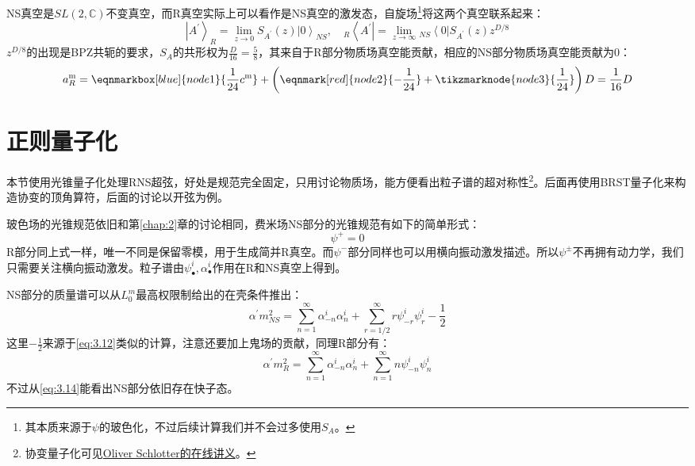 NS真空是$SL(2,\mathbb{C})$不变真空，而R真空实际上可以看作是NS真空的激发态，自旋场\footnote{其本质来源于$\psi$的玻色化\cite{Blumenhagen:2013fgp,Schlotterer:2012zz}，不过后续计算我们并不会过多使用$S_A$。}将这两个真空联系起来：
\begin{equation}
	\left|A^{\prime}\right\rangle_{R}=\lim_{z\to 0}S_{{A^{\prime}}}(z)\left|0\right\rangle_{NS},\quad 
	{}_R\left\langle A^{\prime}\right|=\lim_{z\to\infty}{}_{NS}\left\langle0\right|S_{{A^{\prime}}}(z)z^{D/8}
\end{equation}
$z^{D/8}$的出现是BPZ共轭的要求\cite{itocft}，$S_A$的共形权为$\frac{D}{16}=\frac58$，其来自于R部分物质场真空能贡献，相应的NS部分物质场真空能贡献为0：
\vspace{4em}%
\begin{equation}
	\label{eq:3.12}
	a^{\mathrm{m}}_R=
	\eqnmarkbox[blue]{node1}{\frac{1}{24}c^{\mathrm{m}}}+
	\left(\eqnmark[red]{node2}{-\frac{1}{24}}+\tikzmarknode{node3}{\frac{1}{24}}\right)D=\frac{1}{16}D
\end{equation}
\vspace{1em}
\section{正则量子化}
本节使用光锥量子化处理RNS超弦，好处是规范完全固定，只用讨论物质场，能方便看出粒子谱的超对称性\footnote{协变量子化可见\href{https://www.uu.se/en/department/physics-and-astronomy/research/theoretical-physics/oliver-schlotterer}{Oliver Schlotter的在线讲义}。}。后面再使用BRST量子化来构造协变的顶角算符，后面的讨论以开弦为例。

玻色场的光锥规范依旧和第\ref{chap:2}章的讨论相同，费米场NS部分的光锥规范有如下的简单形式：
\begin{equation}
	\psi^+ = 0
\end{equation}
R部分同上式一样，唯一不同是保留零模，用于生成简并R真空。而$\psi^-$部分同样也可以用横向振动激发描述。所以$\psi^\pm$不再拥有动力学，我们只需要关注横向振动激发。粒子谱由$\psi^i_\bullet,\alpha^i_\bullet$作用在R和NS真空上得到。

NS部分的质量谱可以从$L_0^m$最高权限制给出的在壳条件推出：
\begin{equation}
	\label{eq:3.14}
	\alpha^{\prime}m^2_{NS}=\sum_{n=1}^\infty\alpha_{-n}^i\alpha_n^i+\sum_{r=1/2}^\infty r\psi_{-r}^i\psi_r^i-\frac{1}{2}
\end{equation}
这里$-\frac12$来源于\ref{eq:3.12}类似的计算，注意还要加上鬼场的贡献，同理R部分有：
\begin{equation}
	\alpha^{\prime}m^2_{R}=\sum_{n=1}^\infty\alpha_{-n}^i\alpha_n^i+\sum_{n=1}^\infty n\psi_{-n}^i \psi_n^i
\end{equation}
不过从\ref{eq:3.14}能看出NS部分依旧存在快子态。
